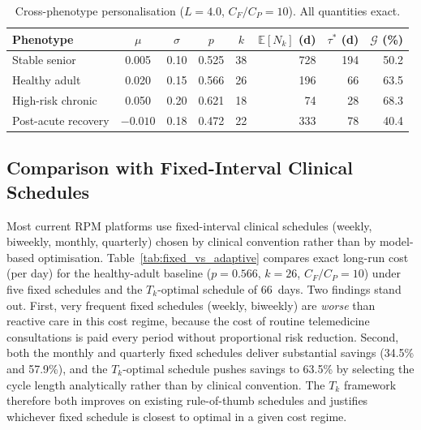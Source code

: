 \documentclass[pdflatex,sn-mathphys-num]{sn-jnl}
\theoremstyle{definition}
\newcommand{\E}{\mathbb{E}}
\numberwithin{equation}{section}
\begin{document}
\begin{table}[htbp]
\centering
\caption{Cross-phenotype personalisation ($L=4.0$, $C_F/C_P=10$). All quantities exact.}
\label{tab:phenotype}
\small
\begin{tabular}{lccccrrr}
\toprule
Phenotype & $\mu$ & $\sigma$ & $p$ & $k$ & $\E[N_k]$ (d) & $\tau^*$ (d) & $\mathcal{G}$ (\%) \\
\midrule
Stable senior        & 0.005 & 0.10 & 0.525 & 38 & 728 & 194 & 50.2 \\
Healthy adult        & 0.020 & 0.15 & 0.566 & 26 & 196 &  66 & 63.5 \\
High-risk chronic    & 0.050 & 0.20 & 0.621 & 18 &  74 &  28 & 68.3 \\
Post-acute recovery  &$-0.010$& 0.18 & 0.472 & 22 & 333 &  78 & 40.4 \\
\bottomrule
\end{tabular}
\end{table}

\subsection{Comparison with Fixed-Interval Clinical Schedules}\label{sec:case_fixed}

Most current RPM platforms use fixed-interval clinical schedules (weekly, biweekly, monthly, quarterly) chosen by clinical convention rather than by model-based optimisation. Table~\ref{tab:fixed_vs_adaptive} compares exact long-run cost (per day) for the healthy-adult baseline ($p=0.566$, $k=26$, $C_F/C_P=10$) under five fixed schedules and the $T_k$-optimal schedule of 66~days. Two findings stand out. First, very frequent fixed schedules (weekly, biweekly) are \emph{worse} than reactive care in this cost regime, because the cost of routine telemedicine consultations is paid every period without proportional risk reduction. Second, both the monthly and quarterly fixed schedules deliver substantial savings (34.5\% and 57.9\%), and the $T_k$-optimal schedule pushes savings to 63.5\% by selecting the cycle length analytically rather than by clinical convention. The $T_k$ framework therefore both improves on existing rule-of-thumb schedules and justifies whichever fixed schedule is closest to optimal in a given cost regime.
\end{document}
